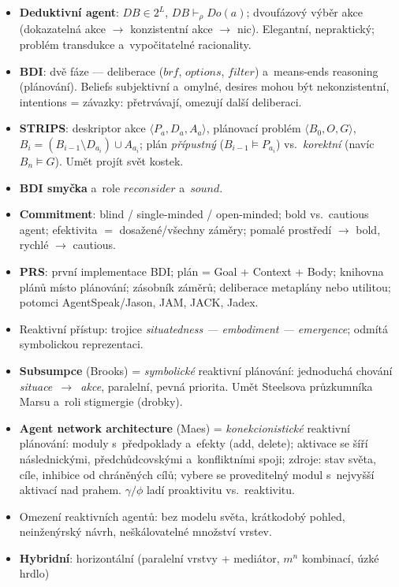 \documentclass[11pt,a4paper]{article}
\theoremstyle{definition}
\begin{document}
\begin{itemize}
\item \textbf{Deduktivní agent}: $\mathit{DB} \in 2^L$, $\mathit{DB} \vdash_\rho \mathit{Do}(a)$;
  dvoufázový výběr akce (dokazatelná akce $\to$ konzistentní akce $\to$ nic).
  Elegantní, nepraktický; problém transdukce a~vypočitatelné racionality.
\item \textbf{BDI}: dvě fáze --- deliberace ($\mathit{brf}$, $\mathit{options}$, $\mathit{filter}$)
  a~means-ends reasoning (plánování). Beliefs subjektivní a~omylné, desires mohou být
  nekonzistentní, intentions = závazky: přetrvávají, omezují další deliberaci.
\item \textbf{STRIPS}: deskriptor akce $\langle P_a,D_a,A_a\rangle$, plánovací problém
  $\langle B_0,O,G\rangle$, $B_i = (B_{i-1}\setminus D_{a_i})\cup A_{a_i}$;
  plán \emph{přípustný} ($B_{i-1}\models P_{a_i}$) vs.\ \emph{korektní} (navíc $B_n \models G$).
  Umět projít svět kostek.
\item \textbf{BDI smyčka} a~role $\mathit{reconsider}$ a~$\mathit{sound}$.
\item \textbf{Commitment}: blind / single-minded / open-minded; bold vs.\ cautious agent;
  efektivita $=$ dosažené/všechny záměry; pomalé prostředí $\to$ bold, rychlé $\to$ cautious.
\item \textbf{PRS}: první implementace BDI; plán = Goal + Context + Body; knihovna plánů místo
  plánování; zásobník záměrů; deliberace metaplány nebo utilitou; potomci AgentSpeak/Jason,
  JAM, JACK, Jadex.
\item Reaktivní přístup: trojice \emph{situatedness --- embodiment --- emergence};
  odmítá symbolickou reprezentaci.
\item \textbf{Subsumpce} (Brooks) = \emph{symbolické} reaktivní plánování: jednoduchá chování
  \emph{situace~$\to$~akce}, paralelní, pevná priorita.
  Umět Steelsova průzkumníka Marsu a~roli stigmergie (drobky).
\item \textbf{Agent network architecture} (Maes) = \emph{konekcionistické} reaktivní
  plánování: moduly s~předpoklady a~efekty (add, delete); aktivace se šíří následnickými,
  předchůdcovskými a~konfliktními spoji; zdroje: stav světa, cíle, inhibice od chráněných
  cílů; vybere se proveditelný modul s~nejvyšší aktivací nad prahem. $\gamma/\phi$ ladí
  proaktivitu vs.\ reaktivitu.
\item Omezení reaktivních agentů: bez modelu světa, krátkodobý pohled, neinženýrský návrh,
  neškálovatelné množství vrstev.
\item \textbf{Hybridní}: horizontální (paralelní vrstvy + mediátor, $m^n$ kombinací, úzké hrdlo)

\end{itemize}
\end{document}
